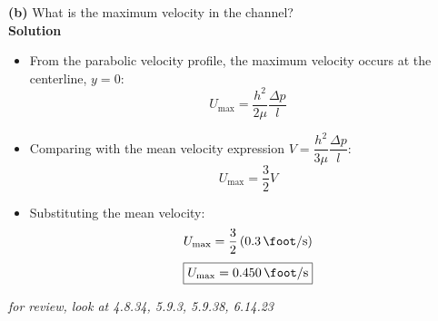 ﻿\documentclass[12pt]{article}
\begin{document}
\textbf{(b)} What is the maximum velocity in the channel?\\
\textbf{Solution}
\begin{itemize}
    \item From the parabolic velocity profile, the maximum velocity occurs at the centerline, $y=0$:
    \[U_{\max}=\frac{h^2}{2\mu}\frac{\Delta p}{l}\]
    \item Comparing with the mean velocity expression $V=\dfrac{h^2}{3\mu}\dfrac{\Delta p}{l}$:
    \[U_{\max}=\frac{3}{2}V\]
    \item Substituting the mean velocity:
    \[U_{\max}=\frac{3}{2}\left(\SI{0.3}{\foot\per\second}\right)\]
    \[\boxed{U_{\max}=\SI{0.450}{\foot\per\second}}\]
\end{itemize}
\textit{for review, look at 4.8.34, 5.9.3, 5.9.38, 6.14.23}
\end{document}

